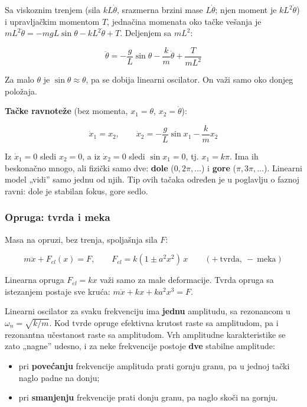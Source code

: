 \documentclass[11pt,a4paper,parskip=half,headsepline,numbers=noenddot]{scrartcl}
\begin{document}
Sa viskoznim trenjem (sila \(kL\dot\theta\), srazmerna brzini mase \(L\dot\theta\); njen moment je \(kL^2\dot\theta\)) i upravljačkim momentom \(T\), jednačina momenata oko tačke vešanja je \(mL^2\ddot\theta = -mgL\sin\theta - kL^2\dot\theta + T\). Deljenjem sa \(mL^2\):

\[\ddot\theta = -\frac{g}{L}\sin\theta - \frac{k}{m}\dot\theta + \frac{T}{mL^2}\]

Za malo \(\theta\) je \(\sin\theta \approx \theta\), pa se dobija linearni oscilator. On važi samo oko donjeg položaja.

\textbf{Tačke ravnoteže} (bez momenta, \(x_1 = \theta\), \(x_2 = \dot\theta\)):

\[\dot x_1 = x_2, \qquad \dot x_2 = -\frac{g}{L}\sin x_1 - \frac{k}{m}x_2\]

Iz \(\dot x_1 = 0\) sledi \(x_2 = 0\), a iz \(\dot x_2 = 0\) sledi \(\sin x_1 = 0\), tj. \(x_1 = k\pi\). Ima ih beskonačno mnogo, ali fizički samo dve: \textbf{dole} (\(0, 2\pi, \dots\)) i \textbf{gore} (\(\pi, 3\pi, \dots\)). Linearni model „vidi'' samo jednu od njih. Tip ovih tačaka određen je u poglavlju o faznoj ravni: dole je stabilan fokus, gore sedlo.

\subsubsection{Opruga: tvrda i meka}

Masa na opruzi, bez trenja, spoljašnja sila \(F\):

\[m\ddot x + F_{el}(x) = F, \qquad F_{el} = k(1 \pm a^2x^2)\,x \qquad (+\ \text{tvrda},\ -\ \text{meka})\]

Linearna opruga \(F_{el} = kx\) važi samo za male deformacije. Tvrda opruga sa istezanjem postaje sve kruća: \(m\ddot x + kx + ka^2x^3 = F\).

Linearni oscilator za svaku frekvenciju ima \textbf{jednu} amplitudu, sa rezonancom u \(\omega_n = \sqrt{k/m}\). Kod tvrde opruge efektivna krutost raste sa amplitudom, pa i rezonantna učestanost raste sa amplitudom. Vrh amplitudne karakteristike se zato „nagne'' udesno, i za neke frekvencije postoje \textbf{dve} stabilne amplitude:

\begin{itemize}
\item pri \textbf{povećanju} frekvencije amplituda prati gornju granu, pa u jednoj tački naglo padne na donju;
\item pri \textbf{smanjenju} frekvencije prati donju granu, pa naglo skoči na gornju.
\end{itemize}
\end{document}
